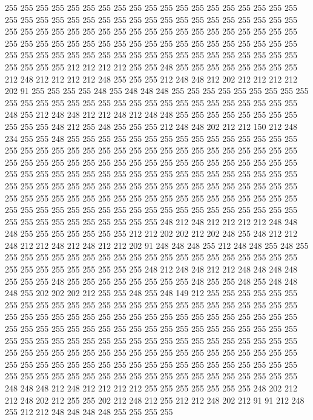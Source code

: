 255 255 255 255 255 255 255 255 255 255 255 255 255 255 255 255 255 255 255 255
255 255 255 255 255 255 255 255 255 255 255 255 255 255 255 255 255 255 255 255
255 255 255 255 255 255 255 255 255 255 255 255 255 255 255 255 255 255 255 255
255 255 255 255 255 255 255 255 255 255 255 255 255 255 255 255 255 255 255 255
255 255 255 255 255 255 255 255 255 255 255 255 255 255 255 255 255 255 255 212
212 212 212 255 255 248 255 255 255 255 255 255 255 255 212 248 212 212 212 212
248 255 255 255 212 248 248 212 202 212 212 212 212 202 91 255 255 255 255 248
255 248 248 248 255 255 255 255 255 255 255 255 255 255 255 255 255 255 255 255
255 255 255 255 255 255 255 255 255 255 255 255 248 255 212 248 248 212 212 248
212 248 248 255 255 255 255 255 255 255 255 255 255 255 248 212 255 248 255 255
255 212 248 248 202 212 212 150 212 248 234 255 255 248 255 255 255 255 255 255
255 255 255 255 255 255 255 255 255 255 255 255 255 255 255 255 255 255 255 255
255 255 255 255 255 255 255 255 255 255 255 255 255 255 255 255 255 255 255 255
255 255 255 255 255 255 255 255 255 255 255 255 255 255 255 255 255 255 255 255
255 255 255 255 255 255 255 255 255 255 255 255 255 255 255 255 255 255 255 255
255 255 255 255 255 255 255 255 255 255 255 255 255 255 255 255 255 255 255 255
255 255 255 255 255 255 255 255 255 255 255 255 255 255 255 255 255 255 255 255
255 255 255 255 255 255 255 255 255 255 255 255 255 248 212 248 212 212 212 212
248 248 248 255 255 255 255 255 255 255 212 212 202 202 212 202 248 255 248 212
212 248 212 212 248 212 248 212 212 202 91 248 248 248 255 212 248 248 255 248
255 255 255 255 255 255 255 255 255 255 255 255 255 255 255 255 255 255 255 255
255 255 255 255 255 255 255 255 255 248 212 248 248 212 212 248 248 248 248 255
255 255 248 255 255 255 255 255 255 255 255 248 255 255 248 255 248 248 248 255
202 202 202 212 255 255 248 255 248 149 212 255 255 255 255 255 255 255 255 255
255 255 255 255 255 255 255 255 255 255 255 255 255 255 255 255 255 255 255 255
255 255 255 255 255 255 255 255 255 255 255 255 255 255 255 255 255 255 255 255
255 255 255 255 255 255 255 255 255 255 255 255 255 255 255 255 255 255 255 255
255 255 255 255 255 255 255 255 255 255 255 255 255 255 255 255 255 255 255 255
255 255 255 255 255 255 255 255 255 255 255 255 255 255 255 255 255 255 255 255
255 255 255 255 255 255 255 255 255 255 255 255 255 255 255 255 255 255 255 255
255 255 255 255 255 255 255 255 255 255 248 248 248 212 248 212 212 212 212 255
255 255 255 255 255 255 248 202 212 212 248 202 212 255 255 202 212 248 212 255
212 212 248 202 212 91 91 212 248 255 212 212 248 248 248 248 255 255 255 255
